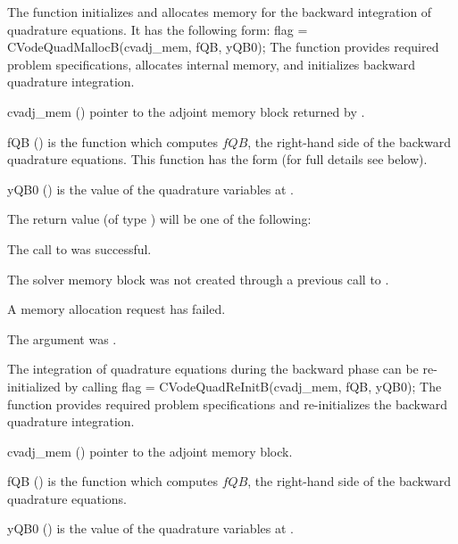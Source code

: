 The function  initializes and allocates memory for the backward
integration of quadrature equations. It has the following form:
{
flag = CVodeQuadMallocB(cvadj\_mem, fQB, yQB0);
}
{
  The function  provides required problem specifications,
  allocates internal memory, and initializes backward quadrature integration.
}
{
  \begin{args}
  \item[cvadj\_mem] ()
    pointer to the adjoint memory block returned by .
  \item[fQB] ()
    is the {\C} function which computes $fQB$, the right-hand side of the 
    backward quadrature equations. This function has the form 
     (for full details see below).
  \item[yQB0] ()
    is the value of the quadrature variables at .
  \end{args}
}
{
  The return value  (of type ) will be one of the following:
  \begin{args}
  \item[\Id{CV\_SUCCESS}]
    The call to  was successful.
  \item[\Id{CV\_MEM\_NULL}] 
    The {\cvodes} solver memory block was not created through a previous 
    call to .
  \item[\Id{CV\_MEM\_FAIL}] 
    A memory allocation request has failed.
  \item[\Id{CV\_ADJMEM\_NULL}]
    The  argument was .
  \end{args}
}
{}
The integration of quadrature equations during the backward phase can be
re-initialized by calling
{
  flag = CVodeQuadReInitB(cvadj\_mem, fQB, yQB0);
}
{
  The function  provides required problem specifications 
  and re-initializes the backward quadrature integration.
}
{
  \begin{args}
  \item[cvadj\_mem] ()
    pointer to the adjoint memory block.
  \item[fQB] ()
    is the {\C} function which computes $fQB$, the right-hand side of the 
    backward quadrature equations.
  \item[yQB0] ()
    is the value of the quadrature variables at .
  \end{args}
}
